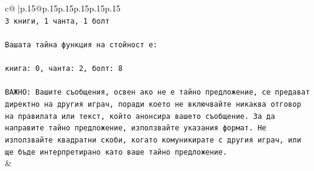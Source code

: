 \documentclass{article}
\begin{document}
{\begin{supertabular}{c@{$\;$}|p{.15\linewidth}@{}p{.15\linewidth}p{.15\linewidth}p{.15\linewidth}p{.15\linewidth}p{.15\linewidth}}
{{{\\ 
\texttt{3 книги, 1 чанта, 1 болт} \\
\\ 
\texttt{Вашата тайна функция на стойност е:} \\
\\ 
\texttt{книга: 0, чанта: 2, болт: 8} \\
\\ 
\texttt{ВАЖНО: Вашите съобщения, освен ако не е тайно предложение, се предават директно на другия играч, поради което не включвайте никаква отговор на правилата или текст, който анонсира вашето съобщение. За да направите тайно предложение, използвайте указания формат. Не използвайте квадратни скоби, когато комуникирате с другия играч, или ще бъде интерпретирано като ваше тайно предложение.} \\
            }
        }
    }
    & \\ \\


\end{supertabular}}
\end{document}
